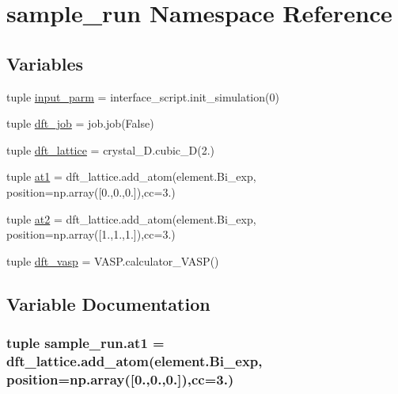 \hypertarget{namespacesample__run}{\section{sample\+\_\+run Namespace Reference}
\label{namespacesample__run}
}
\subsection*{Variables}
\begin{DoxyCompactItemize}
\item 
tuple \hyperlink{namespacesample__run_a1725ba2fc9260075ad326ae3a89cc20f}{input\+\_\+parm} = interface\+\_\+script.\+init\+\_\+simulation(0)
\item 
tuple \hyperlink{namespacesample__run_aa032765ae1aa4d996d7186fa8a379888}{dft\+\_\+job} = job.\+job(False)
\item 
tuple \hyperlink{namespacesample__run_a14f8592f9c3b175cd3705824d72dc516}{dft\+\_\+lattice} = crystal\+\_\+D.\+cubic\+\_\+D(2.)
\item 
tuple \hyperlink{namespacesample__run_a9c2998e98e5c7f8a7d68086a8368deda}{at1} = dft\+\_\+lattice.\+add\+\_\+atom(element.\+Bi\+\_\+exp, position=np.\+array(\mbox{[}0.,0.,0.\mbox{]}),cc=3.)
\item 
tuple \hyperlink{namespacesample__run_a03c770a21d5144cd53671d6f80744c33}{at2} = dft\+\_\+lattice.\+add\+\_\+atom(element.\+Bi\+\_\+exp, position=np.\+array(\mbox{[}1.,1.,1.\mbox{]}),cc=3.)
\item 
tuple \hyperlink{namespacesample__run_a5d55a2760f29354033cb6b08bbf078ec}{dft\+\_\+vasp} = V\+A\+S\+P.\+calculator\+\_\+\+V\+A\+S\+P()
\end{DoxyCompactItemize}


\subsection{Variable Documentation}
\hypertarget{namespacesample__run_a9c2998e98e5c7f8a7d68086a8368deda}{
\subsubsection[{at1}]{\setlength{\rightskip}{0pt plus 5cm}tuple sample\+\_\+run.\+at1 = dft\+\_\+lattice.\+add\+\_\+atom(element.\+Bi\+\_\+exp, position=np.\+array(\mbox{[}0.,0.,0.\mbox{]}),cc=3.)}}\label{namespacesample__run_a9c2998e98e5c7f8a7d68086a8368deda}


